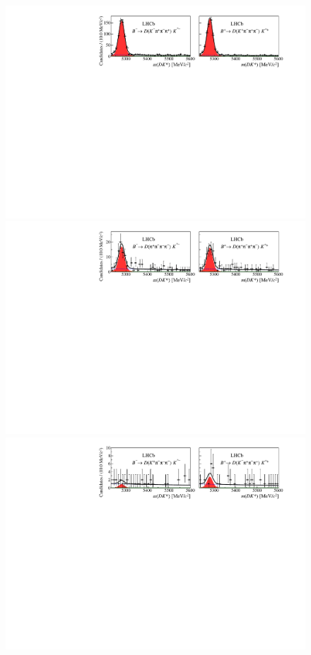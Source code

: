 \begin{figure}
\includegraphics[width=\linewidth]{figures/results/canvas_d2kpipipi.pdf}
\hfill
\includegraphics[width=\linewidth]{figures/results/canvas_d2pipipipi.pdf}
\hfill
\includegraphics[width=\linewidth]{figures/results/canvas_d2pikpipi.pdf}

\end{figure}
